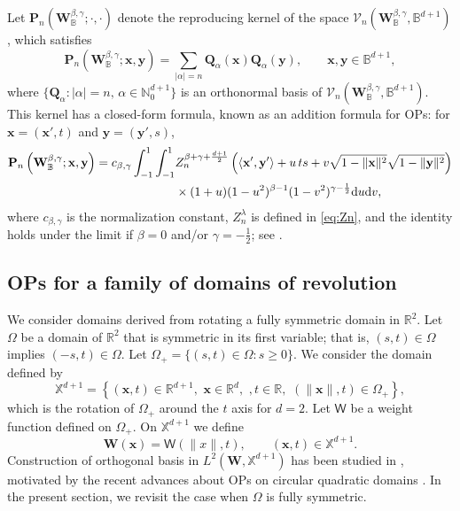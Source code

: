 \documentclass{amsart}
\theoremstyle{remark}
\def\la{{\langle}}
\def\ra{{\rangle}}
\def\d{\mathrm{d}}
\def\sW{{\mathsf W}}
\def\a{{\alpha}}
\def\b{{\beta}}
\def\g{{\gamma}}
\def\l{{\lambda}}
\def\la{{\langle}}
\def\ra{{\rangle}}
\def\xb{{\mathbf x}}
\def\yb{{\mathbf y}}
\def\Pb{{\mathbf P}}
\def\Qb{{\mathbf Q}}
\def\Wb{{\mathbf W}}
\def\CV{{\mathcal V}}
\def\BB{{\mathbb B}}
\def\NN{{\mathbb N}}
\def\RR{{\mathbb R}}
\def\XX{{\mathbb X}}
\def\f{\frac}
\begin{document}
Let $\Pb_n(\Wb_\BB^{\b,\g}; \cdot,\cdot)$ denote the reproducing kernel of the space $\CV_n(\Wb_\BB^{\b,\g},\BB^{d+1})$,
which satisfies 
$$
   \Pb_n\left(\Wb_\BB^{\b,\g}; \xb,\yb\right) = \sum_{|\alpha|=n} \Qb_\alpha(\xb) \Qb_\alpha(\yb), \qquad \xb, \yb \in \BB^{d+1}, 
$$
where $\{\Qb_\alpha:  |\alpha| = n, \, \a \in \NN_0^{d+1}\}$ is an orthonormal basis of  $\CV_n(\Wb_\BB^{\b,\g},\BB^{d+1})$.
This kernel has a closed-form formula, known as an addition formula for OPs: for $\xb=(\xb',t)$ and $\yb = (\yb',s)$,  
\begin{align}\label{eq:kernel_Bd}
    \Pb_n\left(\Wb_\BB^{\b,\g}; \xb,\yb\right) = c_{\b,\g} \int_{-1}^1 \int_{-1}^1 
       & Z_n^{\b+\g+\frac{d+1}{2}} \left(\la \xb',\yb' \ra + u\, t s + v \sqrt{1-\|\xb\|^2}  \sqrt{1-\|\yb\|^2} \right) \notag \\
        & \times  (1+u) (1-u^2)^{\b-1} (1-v^2)^{\g-\f12} \d u \d v,
\end{align}
where $c_{\b,\g}$ is the normalization constant, $Z_n^\l$ is defined in \eqref{eq:Zn}, and the identity holds under 
the limit if $\b = 0$ and/or $\g =-\f12$; see \cite[Theorem 8.1.16]{DX}.  

\subsection{OPs for a family of domains of revolution}
We consider domains derived from rotating a fully symmetric domain in $\RR^2$. Let $\Omega$ be a 
domain of $\RR^2$ that is symmetric in its first variable; that is, $(s,t) \in \Omega$ implies $(-s,t) \in \Omega$. Let 
$\Omega_+ = \{(s,t) \in \Omega: s \ge 0\}$. We consider the domain defined by 
$$
 \XX^{d+1} = \left\{ (\xb,t) \in  \RR^{d+1}, \,\,  \xb \in \RR^d, \,\, , t \in\RR, \,\, (\|\xb \|,t ) \in \Omega_+ \right \},
$$
which is the rotation of $\Omega_+$ around the $t$ axis for $d=2$. Let $\sW$ be a weight function defined 
on $\Omega_+$. On $\XX^{d+1}$ we define
$$
      \Wb(\xb) = \sW(\|x\|,t), \qquad (\xb, t) \in \XX^{d+1}.
$$
Construction of orthogonal basis in $L^2(\Wb,\XX^{d+1})$ has been studied in \cite{X24}, motivated by the recent
advances about OPs on circular quadratic domains \cite{OX, X20, X21a}. In the present section, we 
revisit the case when $\Omega$ is fully symmetric. 
\end{document}
